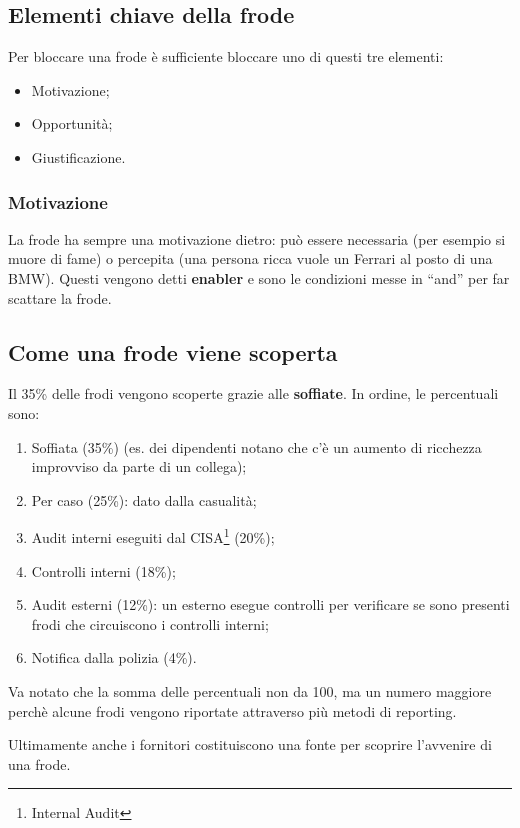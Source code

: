\subsection{Elementi chiave della frode}

Per bloccare una frode è sufficiente bloccare uno di questi tre elementi:
\begin{itemize}
  \item Motivazione;
  \item Opportunità;
  \item Giustificazione.
\end{itemize}

\subsubsection{Motivazione}

La frode ha sempre una motivazione dietro: può essere necessaria (per esempio
si muore di fame) o percepita (una persona ricca vuole un Ferrari al posto di
una BMW). Questi vengono detti \textbf{enabler} e sono le condizioni messe in
``and'' per far scattare la frode.

\subsection{Come una frode viene scoperta}

Il 35\% delle frodi vengono scoperte grazie alle \textbf{soffiate}. In ordine,
le percentuali sono:
\begin{enumerate}
  \item Soffiata (35\%) (es. dei dipendenti notano che c'è un aumento di ricchezza 
  improvviso da parte di un collega);
  \item Per caso (25\%): dato dalla casualità;
  \item Audit interni eseguiti dal CISA\footnote{Internal Audit} (20\%);
  \item Controlli interni (18\%);
  \item Audit esterni (12\%): un esterno esegue controlli per verificare se 
  sono presenti frodi che circuiscono i controlli interni;
  \item Notifica dalla polizia (4\%).
\end{enumerate}
Va notato che la somma delle percentuali non da 100, ma un numero maggiore
perchè alcune frodi vengono riportate attraverso più metodi di reporting. 

Ultimamente anche i fornitori costituiscono una fonte per scoprire l'avvenire 
di una frode.

